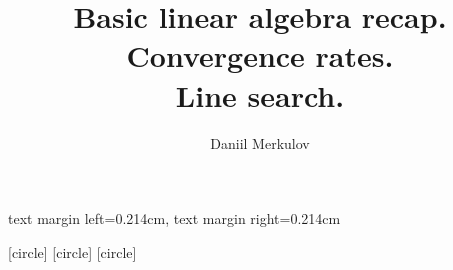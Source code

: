 
\usepackage{animate}
\usepackage{caption}
\usepackage{subcaption}
\usepackage{tikz}
\usepackage{cancel}
\usepackage{booktabs}
\usepackage{ stmaryrd }
\usepackage[export]{adjustbox}
\usepackage{fontawesome5}
\usepackage{algorithmic}
\usepackage{amsmath}
\usepackage{yfonts}
\graphicspath{{../../files/}}

\newcommand{\theHalgorithm}{\arabic{algorithm}}
\usepackage[ruled,vlined]{algorithm2e}
\renewcommand{\algorithmicrequire}{\textbf{Input:}}
\renewcommand{\algorithmicensure}{\textbf{Output:}}
\newcommand{\vect}[1]{\boldsymbol{\mathbf{#1}}}



\setbeamersize
{
    text margin left=0.214cm,
    text margin right=0.214cm
}

[circle] %
[circle] %
[circle] %


\usenavigationsymbolstemplate{}

\newcommand*{\Scale}[2][4]{\scalebox{#1}{$#2$}}%
\newcommand{\argmin}{\operatornamewithlimits{argmin}}
\newcommand{\argmax}{\operatornamewithlimits{argmax}}
\newcommand{\la}{\langle}
\newcommand{\ra}{\rangle}

\title{Basic linear algebra recap. Convergence rates. \\Line search.}
\author{Daniil Merkulov}
\date{}